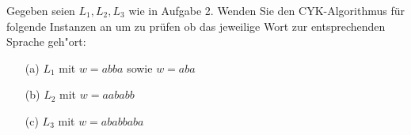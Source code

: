 

\begin{exercise}
Gegeben seien $L_1,L_2,L_3$ wie in Aufgabe 2.
Wenden Sie den CYK-Algorithmus für folgende Instanzen an
um zu prüfen ob das jeweilige Wort zur entsprechenden 
Sprache geh"ort:


\begin{enumerate}
	\item [(a)] $L_1$ mit $w=abba$ sowie $w=aba$
	\item [(b)] $L_2$ mit $w=aababb$
	\item [(c)] $L_3$ mit $w=ababbaba$
\end{enumerate}
\end{exercise}


